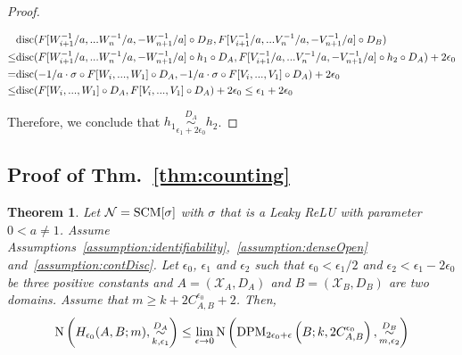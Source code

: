 \documentclass{article} %
\newtheorem{thrm}{Theorem}
\newcommand{\disc}{\textnormal{disc}}
\newcommand{\Cov}{\textnormal{N}}
\begin{document}
\begin{proof}
\begin{small}
\begin{equation}
\begin{aligned}
&\disc(F[W^{-1}_{i+1}/a,...W^{-1}_n/a,-W^{-1}_{n+1}/a] \circ D_B, F[V^{-1}_{i+1}/a,...V^{-1}_n/a,-V^{-1}_{n+1}/a] \circ D_B) \\
\leq& \disc(F[W^{-1}_{i+1}/a,...W^{-1}_n/a,-W^{-1}_{n+1}/a] \circ h_1 \circ D_A, F[V^{-1}_{i+1}/a,...V^{-1}_n/a,-V^{-1}_{n+1}/a] \circ h_2 \circ D_A)+2\epsilon_0 \\
=& \disc(-1/a \cdot \sigma \circ F[W_i,...,W_1] \circ D_A, -1/a \cdot \sigma \circ F[V_i,...,V_1] \circ D_A)+2\epsilon_0 \\
\leq& \disc(F[W_i,...,W_1] \circ D_A, F[V_i,...,V_1] \circ D_A)+2\epsilon_0 \leq \epsilon_1+2\epsilon_0 \\
\end{aligned}
\end{equation}
\end{small}
Therefore, we conclude that $h_1 \overset{D_A}{\underset{\epsilon_1+2\epsilon_0}{\sim}} h_2$.
\end{proof}

\subsection{Proof of Thm.~\ref{thm:counting}}
\label{sec:proofCounting}

\begin{thrm}\label{thm:countingLem} Let $\mathcal{N} = \textnormal{SCM}[\sigma]$ with $\sigma$ that is a Leaky ReLU with parameter $0< a \neq 1$. Assume Assumptions~\ref{assumption:identifiability},~\ref{assumption:denseOpen} and~\ref{assumption:contDisc}. Let $\epsilon_0$, $\epsilon_1$ and $\epsilon_2$ such that $\epsilon_0 < \epsilon_1/2$ and $\epsilon_2 < \epsilon_1-2\epsilon_0$ be three positive constants and $A = (\mathcal{X}_A,D_A)$ and $B = (\mathcal{X}_B, D_B)$ are two domains. Assume that $m \geq k+2C^{\epsilon_0}_{A,B}+2$. Then, 
\begin{equation}
\begin{aligned}
\Cov\left(H_{\epsilon_0}(A,B;m),\overset{D_A}{\underset{k,\epsilon_1}{\sim}}\right) 
&\leq \lim_{\epsilon \to 0} \Cov\left (\textnormal{DPM}_{2\epsilon_0+\epsilon}\left(B; k, 2C^{\epsilon_0}_{A,B} \right), \overset{D_B}{\underset{m,\epsilon_2}{\sim}} \right) \\
\end{aligned}
\end{equation}
\end{thrm}
\end{document}
